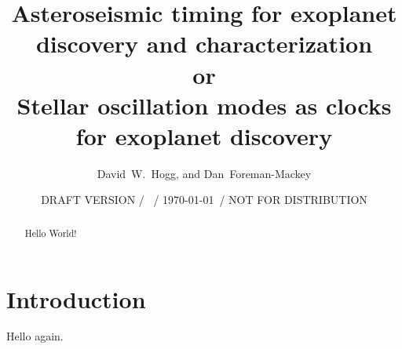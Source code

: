 \documentclass[12pt, preprint]{aastex}
\newcounter{affil}
\begin{document}
\title{
  Asteroseismic timing for exoplanet discovery and characterization
  \\ or \\
  Stellar oscillation modes as clocks for exoplanet discovery
}
\author{
  David~W.~Hogg\altaffilmark{\ref{ccpp},\ref{cds},\ref{mpia},\ref{email}},
  and
  Dan~Foreman-Mackey\altaffilmark{\ref{ccpp}}
}
\date{DRAFT VERSION / \texttt{\githash}\ / \today\ / NOT FOR DISTRIBUTION}
\label{ccpp}
\label{cds}
\label{mpia}
\label{email}

\begin{abstract}
Hello World!
\end{abstract}

\section{Introduction}

Hello again.
\end{document}
